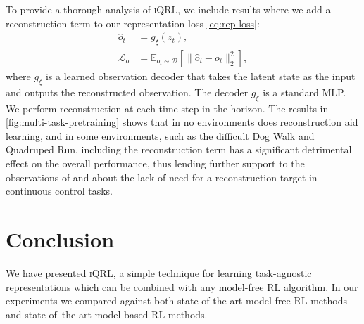 \documentclass{article}
\theoremstyle{plain}
\theoremstyle{definition}
\theoremstyle{remark}
\newcommand{\our}{\textsc{iQRL}\xspace}
\begin{document}
To provide a thorough analysis of \our, we include results where we add a reconstruction term to our representation loss \cref{eq:rep-loss}:
\begin{align*}
	\hat{o}_t &= g_\xi(z_t), \\
	\mathcal{L}_o &= \mathbb{E}_{o_t\sim\mathcal{D}} [\| \hat{o}_t - o_t \|_2^2],
\end{align*}
where $g_\xi$ is a learned observation decoder that takes the latent state as the input and outputs the reconstructed observation. The decoder $g_\xi$ is a standard MLP. We perform reconstruction at each time step in the horizon.
The results in \cref{fig:multi-task-pretraining} shows that in no environments does reconstruction aid learning, and in some environments, such as the difficult Dog Walk and Quadruped Run, including the reconstruction term has a significant detrimental effect on the overall performance, thus lending further support to the observations of \citet{zhaoSimplifiedTemporalConsistency2023} and \citet{hansenTemporalDifferenceLearning2022} about the lack of need for a reconstruction target in continuous control tasks.









\section{Conclusion}
\label{conclusion}
We have presented \our, a simple technique for learning task-agnostic representations which can be combined with
any model-free RL algorithm.
In our experiments we compared against both state-of-the-art model-free RL methods and state-of--the-art model-based RL methods.
\end{document}
